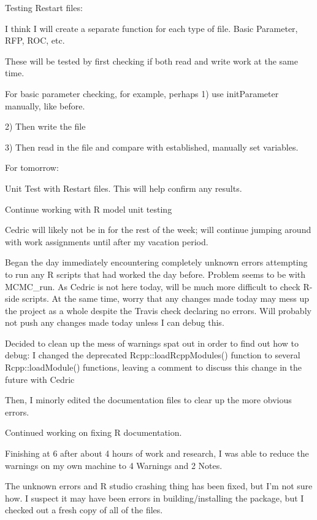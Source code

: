 \documentclass[12pt,hyperref]{labbook}
\newcommand{\sep}{\discretionary{}{}{}} %
\begin{document}
Testing Restart files:

I think I will create a separate function for each type of file. Basic Parameter, RFP, ROC, etc.

These will be tested by first checking if both read and write work at the same time.

For basic parameter checking, for example, perhaps 1) use initParameter manually, like before.

2) Then write the file

3) Then read in the file and compare with established, manually set variables.


For tomorrow:

Unit Test with Restart files. This will help confirm any results.

Continue working with R model unit testing

Cedric will likely not be in for the rest of the week; will continue jumping around with
work assignments until after my vacation period.


Began the day immediately encountering completely unknown errors attempting to run any
R scripts that had worked the day before. Problem seems to be with MCMC\_run. As Cedric
is not here today, will be much more difficult to check R-side scripts. At the same time,
worry that any changes made today may mess up the project as a whole despite
the Travis check declaring no errors. Will probably not push any changes made today
unless I can debug this.

Decided to clean up the mess of warnings spat out in order to find out how to debug:
I changed the deprecated Rcpp::\sep load\sep Rcpp\sep Modules() function
to several Rcpp::\sep load\sep Module() functions, 
leaving a comment to discuss this change in the future with Cedric

Then, I minorly edited the documentation files to clear up the more obvious errors.


Continued working on fixing R documentation.

Finishing at 6 after about 4 hours of work and research, I was able to reduce the warnings
on my own machine to 4 Warnings and 2 Notes.

The unknown errors and R studio crashing thing has been fixed, but I'm not sure how.
I suspect it may have been errors in building/installing the package, but I checked out
a fresh copy of all of the files.
\end{document}

